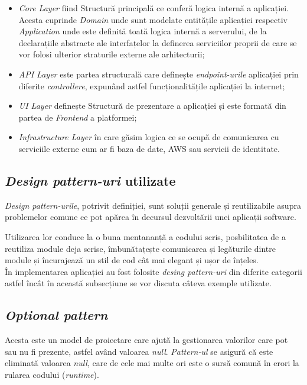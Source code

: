 \begin{itemize}
	\item  \textit{Core Layer} fiind Structură principală ce conferă logica internă a aplicației. Acesta cuprinde \textit{Domain} unde sunt modelate entitățile aplicației respectiv \textit{Application} unde este definită toată logica internă a serverului,
	de la declarațiile abstracte ale interfațelor la definerea serviciilor proprii de care se vor folosi ulterior straturile externe ale arhitecturii;
	
	\item \textit{API Layer} este partea structurală care definește \textit{endpoint-urile} aplicației prin diferite \textit{controllere}, expunând astfel funcționalitățile aplicației la internet;
	
  	\item \textit{UI Layer} definește Structură de prezentare a aplicației și este formată din partea de \textit{Frontend} a platformei;
  
 	 \item \textit{Infrastructure Layer} în care găsim logica ce se ocupă de comunicarea cu serviciile externe cum ar fi baza de date, AWS sau servicii de identitate.
 	 
\end{itemize}

\subsection*{\textit{Design pattern-uri} utilizate}

\textit{Design pattern-urile}, potrivit definiției, sunt soluții generale și reutilizabile asupra problemelor comune ce pot apărea în decursul dezvoltării unei aplicații software.

Utilizarea lor conduce la o buna mentananță a codului scris, posbilitatea de a reutiliza module deja scrise, îmbunătațește comunicarea și legăturile dintre module și încurajează un stil de cod cât mai elegant și ușor de înțeles.\\
În implementarea aplicației au fost folosite \textit{desing pattern-uri} din diferite categorii astfel încât în această subsecțiune se vor discuta câteva exemple utilizate.

\subsection*{\textit{Optional pattern}}
Acesta este un model de proiectare care ajută la gestionarea valorilor care pot sau nu fi prezente, astfel având valoarea \textit{null}. \textit{Pattern-ul} se asigură că este eliminată valoarea \textit{null}, care de cele mai multe ori este o sursă comună în erori la rularea codului (\textit{runtime}).

